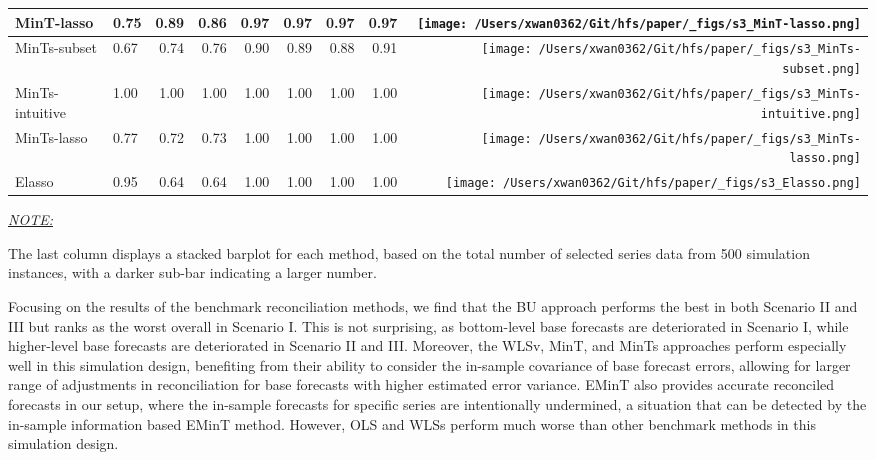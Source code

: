 \documentclass[11pt,a4paper,]{article}
\begin{document}
\begin{table}[!h]
{\begin{threeparttable}
\begin{tabular}{llrrrrrr>{}r}
MinT-lasso & 0.75 & 0.89 & 0.86 & 0.97 & 0.97 & 0.97 & 0.97 & \texttt{[image: /Users/xwan0362/Git/hfs/paper/\_figs/s3\_MinT-lasso.png]}\\
\midrule
MinTs-subset & 0.67 & 0.74 & 0.76 & 0.90 & 0.89 & 0.88 & 0.91 & \texttt{[image: /Users/xwan0362/Git/hfs/paper/\_figs/s3\_MinTs-subset.png]}\\
MinTs-intuitive & 1.00 & 1.00 & 1.00 & 1.00 & 1.00 & 1.00 & 1.00 & \texttt{[image: /Users/xwan0362/Git/hfs/paper/\_figs/s3\_MinTs-intuitive.png]}\\
MinTs-lasso & 0.77 & 0.72 & 0.73 & 1.00 & 1.00 & 1.00 & 1.00 & \texttt{[image: /Users/xwan0362/Git/hfs/paper/\_figs/s3\_MinTs-lasso.png]}\\
\midrule
Elasso & 0.95 & 0.64 & 0.64 & 1.00 & 1.00 & 1.00 & 1.00 & \texttt{[image: /Users/xwan0362/Git/hfs/paper/\_figs/s3\_Elasso.png]}\\
\bottomrule
\end{tabular}
\begin{tablenotes}[para]
\item \underline{\textit{NOTE:}} 
\item The last column displays a stacked barplot for each method, based on the total number of selected series data from 500 simulation instances, with a darker sub-bar indicating a larger number.
\end{tablenotes}
\end{threeparttable}}
\endgroup{}
\end{table}

Focusing on the results of the benchmark reconciliation methods, we find
that the BU approach performs the best in both Scenario II and III but
ranks as the worst overall in Scenario I. This is not surprising, as
bottom-level base forecasts are deteriorated in Scenario I, while
higher-level base forecasts are deteriorated in Scenario II and III.
Moreover, the WLSv, MinT, and MinTs approaches perform especially well
in this simulation design, benefiting from their ability to consider the
in-sample covariance of base forecast errors, allowing for larger range
of adjustments in reconciliation for base forecasts with higher
estimated error variance. EMinT also provides accurate reconciled
forecasts in our setup, where the in-sample forecasts for specific
series are intentionally undermined, a situation that can be detected by
the in-sample information based EMinT method. However, OLS and WLSs
perform much worse than other benchmark methods in this simulation
design.
\end{document}
